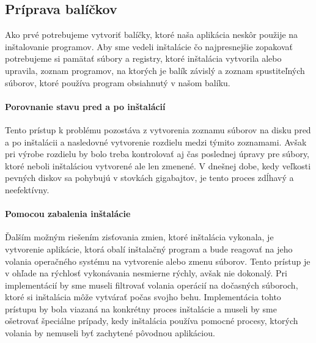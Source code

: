 \subsection{Príprava balíčkov}
Ako prvé potrebujeme vytvoriť balíčky, ktoré naša aplikácia neskôr použije na inštalovanie programov. Aby sme vedeli inštalácie čo najpresnejšie zopakovať potrebujeme si pamätať súbory a registry, ktoré inštalácia vytvorila alebo upravila, zoznam programov, na ktorých je balík závislý a zoznam spustiteľných súborov, ktoré používa program obsiahnutý v našom balíku.

\paragraph{Porovnanie stavu pred a po inštalácií}
Tento prístup k problému pozostáva z vytvorenia zoznamu súborov na disku pred a po inštalácii a nasledovné vytvorenie rozdielu medzi týmito zoznamami. Avšak pri výrobe rozdielu by bolo treba kontrolovať aj čas poslednej úpravy pre súbory, ktoré neboli inštaláciou vytvorené ale len zmenené. V dnešnej dobe, kedy veľkosti pevných diskov sa pohybujú v stovkách gigabajtov, je tento proces zdĺhavý a neefektívny. 
\paragraph{Pomocou zabalenia inštalácie}
Ďalším možným riešením zisťovania zmien, ktoré inštalácia vykonala, je vytvorenie aplikácie, ktorá obalí inštalačný program a bude reagovať na jeho volania operačného systému na vytvorenie alebo zmenu súborov. Tento prístup je v ohľade na rýchlosť vykonávania nesmierne rýchly, avšak nie dokonalý. Pri implementácií by sme museli filtrovať volania operácií na dočasných súboroch, ktoré si inštalácia môže vytvárať počas svojho behu. Implementácia tohto prístupu by bola viazaná na konkrétny proces inštalácie a museli by sme ošetrovať špeciálne prípady, kedy inštalácia používa pomocné procesy, ktorých volania by nemuseli byť zachytené pôvodnou aplikáciou. 
